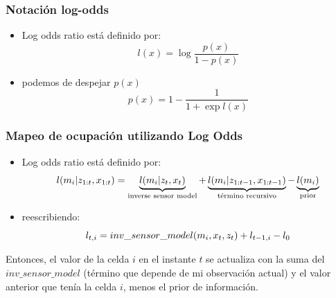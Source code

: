 \begin{frame}
    \frametitle{Notación log-odds}

    \begin{itemize}
        \item Log odds ratio está definido por:
        \begin{equation*}
            l(x) = \log \dfrac{p(x)}{1-p(x)}
        \end{equation*}
        \item podemos de despejar $p(x)$
        \begin{equation*}
            p(x) = 1 - \dfrac{1}{1 + \exp l(x)}
        \end{equation*}
    \end{itemize}
    
\end{frame}

\begin{frame}
    \frametitle{Mapeo de ocupación utilizando Log Odds}
    
    \begin{itemize}
        \item Log odds ratio está definido por:
        \begin{equation*}
            l(m_{i}| z_{1:t}, x_{1:t}) = \underbrace{l(m_{i}| z_{t}, x_{t})}_{\text{inverse sensor model}} + \underbrace{l(m_{i}| z_{1:t-1}, x_{1:t-1})}_{\text{término recursivo}} - \underbrace{l(m_{i})}_{\text{prior}}
        \end{equation*}
        \item reescribiendo:
        \begin{equation*}
            l_{t,i} = inv\_sensor\_model(m_{i}, x_{t}, z_{t}) + l_{t-1,i} - l_{0}
        \end{equation*}
    \end{itemize}
    
    Entonces, el valor de la celda $i$ en el instante $t$ se actualiza con la suma del $inv\_sensor\_model$ (término que depende de mi observación actual) y el valor anterior que tenía la celda $i$, menos el prior de información.
    
\end{frame}

